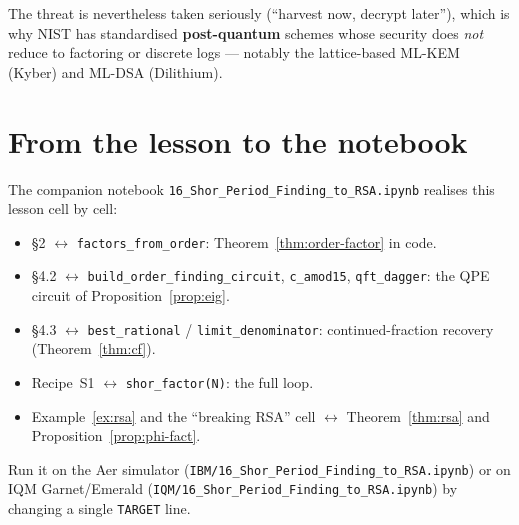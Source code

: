 \documentclass[11pt]{article}
\theoremstyle{plain}
\theoremstyle{definition}
\theoremstyle{remark}
\begin{document}
The threat is nevertheless taken seriously (``harvest now, decrypt later''), which is why NIST
has standardised \textbf{post-quantum} schemes whose security does \emph{not} reduce to
factoring or discrete logs --- notably the lattice-based ML-KEM (Kyber) and ML-DSA (Dilithium).

\section{From the lesson to the notebook}

The companion notebook \texttt{16\_Shor\_Period\_Finding\_to\_RSA.ipynb} realises this lesson cell by cell:
\begin{itemize}[leftmargin=1.6em,itemsep=1pt,topsep=2pt]
  \item \S2 $\leftrightarrow$ \texttt{factors\_from\_order}: Theorem~\ref{thm:order-factor}
        in code.
  \item \S4.2 $\leftrightarrow$ \texttt{build\_order\_finding\_circuit},
        \texttt{c\_amod15}, \texttt{qft\_dagger}: the QPE circuit of
        Proposition~\ref{prop:eig}.
  \item \S4.3 $\leftrightarrow$ \texttt{best\_rational} / \texttt{limit\_denominator}:
        continued-fraction recovery (Theorem~\ref{thm:cf}).
  \item Recipe~S1 $\leftrightarrow$ \texttt{shor\_factor(N)}: the full loop.
  \item Example~\ref{ex:rsa} and the ``breaking RSA'' cell $\leftrightarrow$
        Theorem~\ref{thm:rsa} and Proposition~\ref{prop:phi-fact}.
\end{itemize}
Run it on the Aer simulator (\texttt{IBM/16\_Shor\_Period\_Finding\_to\_RSA.ipynb}) or on IQM Garnet/Emerald
(\texttt{IQM/16\_Shor\_Period\_Finding\_to\_RSA.ipynb}) by changing a single \texttt{TARGET} line.

\end{document}
